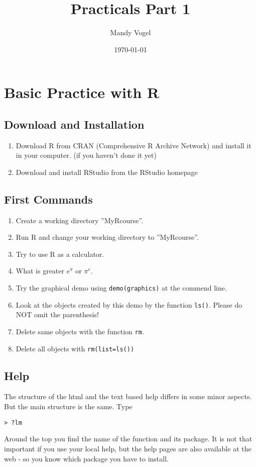 \documentclass[12pt]{article}
\begin{document}
\title{Practicals Part 1}
\author{Mandy Vogel}
\date{\today}
\maketitle

\section{Basic Practice with R}
\subsection{Download and Installation}
\begin{enumerate}
\item Download R from CRAN (Comprehensive R Archive Network) and install it in your computer. (if you haven't done it yet)
\item Download and install RStudio from the RStudio homepage
\end{enumerate}

\subsection{First Commands}
\begin{enumerate}
\item Create a working directory ''MyRcourse''.
\item Run R and change your working directory to ''MyRcourse''.
\item Try to use R as a calculator.
\item What is greater $e^{\pi}$ or $\pi^{e}$.
\item Try the graphical demo using \texttt{demo(graphics)} at the commend line.
\item Look at the objects created by this demo by the function \texttt{ls()}. Please do NOT omit the parenthesis!
\item Delete same objects with the function \texttt{rm}.
\item Delete all objects with \texttt{rm(list=ls())}
\end{enumerate}

\subsection{Help}
The structure of the html and the text based help differs in some minor aspects. But the main structure is the same. Type
\begin{verbatim}
> ?lm
\end{verbatim}
Around the top you find the name of the function and its package. It is not that important if you use your local help, but the help pages are also available at the web - so you know which package you have to install.
\end{document}
